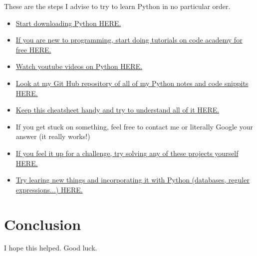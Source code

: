 \documentclass{article}
\begin{document}
These are the steps I advise to try to learn Python in no particular order.



\begin{itemize}
\item \href{http://www.python.org/}{{\color{blue}Start downloading Python  \Large{HERE.}}}

\item \href{http://www.codecademy.com/}{{\color{blue}If you are new to programming, start doing tutorials on code academy for free \Large{HERE.}}}

\item \href{http://www.youtube.com/watch?v=4Mf0h3HphEA}{{\color{blue}Watch youtube videos on Python \Large{HERE.}}}

\item \href{http://www.python.org/}{{\color{blue}Look at my Git Hub repository of all of my Python notes and code snippits \Large{HERE.}}}

\item \href{http://overapi.com/python/}{{\color{blue}Keep this cheatsheet handy and try to understand all of it  \Large{HERE.}}}

\item If you get stuck on something, feel free to contact me or literally Google your answer (it really works!)



\item \href{https://github.com/karan/Projects}{{\color{blue} If you feel it up for a challenge, try solving any of these projects yourself \Large{HERE.}}}

\item \href{http://docs.python.org/2/library/}{{\color{blue} Try learing new things and incorporating it with Python (databases,
reguler expressions...) \Large{HERE.}}}

\end{itemize}


\section{Conclusion}
I hope this helped.  Good luck.
\end{document}
